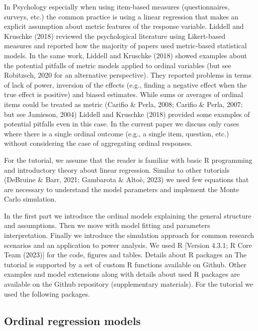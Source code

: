 \documentclass[
  man,floatsintext]{apa6}
\begin{document}
In Psychology especially when using item-based measures (questionnaires, surveys, etc.) the common practice is using a linear regression that makes an explicit assumption about metric features of the response variable. Liddell and Kruschke (2018) reviewed the psychological literature using Likert-based measures and reported how the majority of papers used metric-based statistical models. In the same work, Liddell and Kruschke (2018) showed examples about the potential pitfalls of metric models applied to ordinal variables (but see Robitzsch, 2020 for an alternative perspective). They reported problems in terms of lack of power, inversion of the effects (e.g., finding a negative effect when the true effect is positive) and biased estimates. While sums or averages of ordinal items could be treated as metric (Carifio \& Perla, 2008; Carifio \& Perla, 2007; but see Jamieson, 2004) Liddell and Kruschke (2018) provided some examples of potential pitfalls even in this case. In the current paper we discuss only cases where there is a single ordinal outcome (e.g., a single item, question, etc.) without considering the case of aggregating ordinal responses.

For the tutorial, we assume that the reader is familiar with basic R programming and introductory theory about linear regression. Similar to other tutorials (DeBruine \& Barr, 2021; Gambarota \& Altoè, 2023) we used few equations that are necessary to understand the model parameters and implement the Monte Carlo simulation.

In the first part we introduce the ordinal models explaining the general structure and assumptions. Then we move with model fitting and parameters interpretation. Finally we introduce the simulation approach for common research scenarios and an application to power analysis. We used R {[}Version 4.3.1; R Core Team (2023){]} for the code, figures and tables. Details about R packages an The tutorial is supported by a set of custom R functions available on Github. Other examples and model extensions along with details about used R packages are available on the Github repository (supplementary materials). For the tutorial we used the following packages.

\scriptsize

\normalsize

\subsection{Ordinal regression models}\label{ordinal-regression-models}
\end{document}

